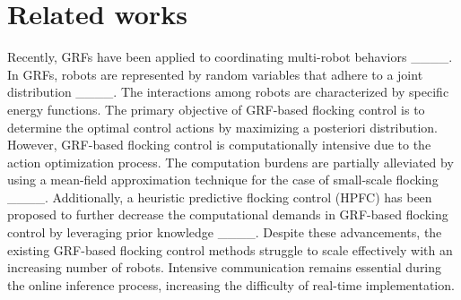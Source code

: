 \section{Related works}
Recently, GRFs have been applied to coordinating multi-robot behaviors ____. In GRFs, robots are represented by random variables that adhere to a joint distribution ____. The interactions among robots are characterized by specific energy functions. The primary objective of GRF-based flocking control is to determine the optimal control actions by maximizing a posteriori distribution.  However,  GRF-based flocking control is computationally intensive due to the action optimization process. The computation burdens are partially alleviated by using a mean-field approximation technique for the case of small-scale flocking  ____.  {Additionally, a heuristic predictive flocking control (HPFC) has been proposed to further decrease the computational demands in GRF-based flocking control by leveraging prior knowledge ____}. 
Despite these advancements, the existing GRF-based flocking control methods struggle to scale effectively with an increasing number of robots. Intensive communication remains essential during the online inference process, increasing the difficulty of real-time implementation.



